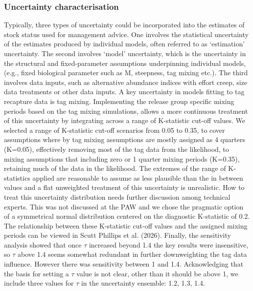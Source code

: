 \documentclass[
  english,
  a4paper,
  a4paper,
  11pt]{SCreport}
\begin{document}
\subsubsection{Uncertainty
characterisation}\label{sec-uncertainty-ensemble}

Typically, three types of uncertainty could be incorporated into the
estimates of stock status used for management advice. One involves the
statistical uncertainty of the estimates produced by individual models,
often referred to as `estimation' uncertainty. The second involves
`model' uncertainty, which is the uncertainty in the structural and
fixed-parameter assumptions underpinning individual models, (e.g., fixed
biological parameter such as M, steepness, tag mixing etc.). The third
involves data inputs, such as alternative abundance indices with effort
creep, size data treatments or other data inputs. A key uncertainty in
models fitting to tag recapture data is tag mixing. Implementing the
release group specific mixing periods based on the tag mixing
simulations, allows a more continuous treatment of this uncertainty by
integrating across a range of K-statistic cut-off values. We selected a
range of K-statistic cut-off scenarios from 0.05 to 0.35, to cover
assumptions where by tag mixing assumptions are mostly assigned as 4
quarters (K=0.05), effectively removing most of the tag data from the
likelihood, to mixing assumptions that including zero or 1 quarter
mixing periods (K=0.35), retaining much of the data in the likelihood.
The extremes of the range of K-statistics applied are reasonable to
assume as less plausible than the in between values and a flat
unweighted treatment of this uncertainty is unrealistic. How to treat
this uncertainty distribution needs further discussion among technical
experts. This was not discussed at the PAW and we chose the pragmatic
option of a symmetrical normal distribution centered on the diagnostic
K-statistic of 0.2. The relationship between these K-statistic cut-off
values and the assigned mixing periods can be viewed in Scutt Phillips
et al. (2026). Finally, the sensitivity analysis showed that once
\(\tau\) increased beyond 1.4 the key results were insensitive, so
\(\tau\) above 1.4 seems somewhat redundant in further downweighting the
tag data influence. However there was sensitivity between 1 and 1.4.
Acknowledging that the basis for setting a \(\tau\) value is not clear,
other than it should be above 1, we include three values for \(\tau\) in
the uncertainty ensemble: 1.2, 1.3, 1.4.
\end{document}
